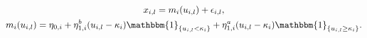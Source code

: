 \begin{equation}
  \begin{gathered}
    x_{i, l} = m_{i}(u_{i, l}) + \epsilon_{i, l}, \\
    m_{i}(u_{i, l}) =
      \eta_{0, i} +
      \eta^{b}_{1, i}(u_{i, l} - \kappa_{i}) \mathbbm{1}_{\{u_{i, l} < \kappa_{i}\}} +
      \eta^{a}_{1, i}(u_{i, l} - \kappa_{i}) \mathbbm{1}_{\{u_{i, l} \geq \kappa_{i}\}}.
  \end{gathered}
  \label{eqn:piecewise-fluid-model}
\end{equation}